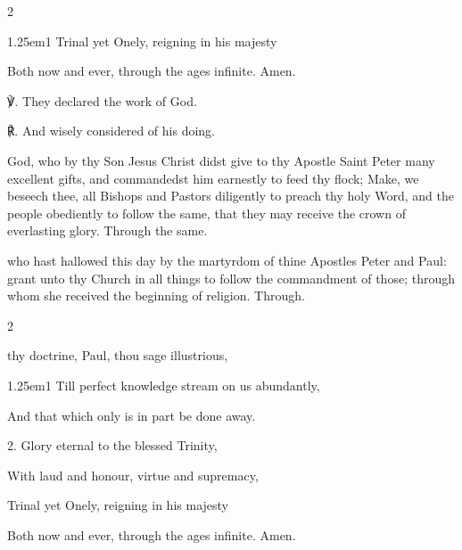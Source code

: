 \begin{paracol}{2}
\begin{hangparas}{1.25em}{1}
Trinal yet Onely, reigning in his majesty

Both now and ever, through the ages infinite. Amen.\\
\end{hangparas}

℣. They declared the work of God.

℟. And wisely considered of his doing.


\collect
{} God, who by thy Son Jesus Christ didst give to thy Apostle Saint Peter many excellent gifts, and commandedst him earnestly to feed thy flock; Make, we beseech thee, all Bishops and Pastors diligently to preach thy holy Word, and the people obediently to follow the same, that they may receive the crown of everlasting glory. Through the same.

 who hast hallowed this day by the martyrdom of thine Apostles Peter and Paul: grant unto thy Church in all things to follow the commandment of those; through whom she received the beginning of religion. Through.

\fussy	
\end{paracol}




\firstEvensong
{}

\firstEvensongHymn

\begin{multicols}{2}
\sloppy

 thy doctrine, Paul, thou sage illustrious,


\begin{hangparas}{1.25em}{1}
Till perfect knowledge stream on us abundantly,

And that which only is in part be done away.

\newcolumn

2. Glory eternal to the blessed Trinity,

With laud and honour, virtue and supremacy,

Trinal yet Onely, reigning in his majesty

Both now and ever, through the ages infinite. Amen.\\

\end{hangparas}

\fussy	
\end{multicols}

